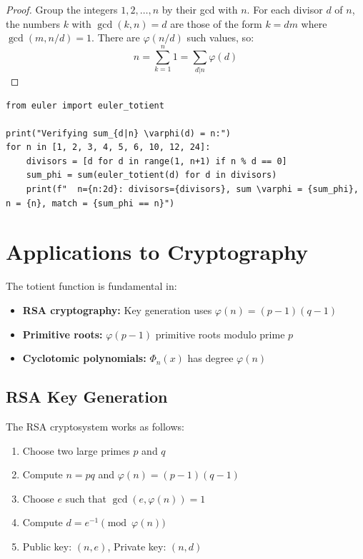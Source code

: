 \begin{proof}
Group the integers $1, 2, \ldots, n$ by their gcd with $n$. For each divisor $d$ of $n$,
the numbers $k$ with $\gcd(k,n) = d$ are those of the form $k = dm$ where $\gcd(m, n/d) = 1$.
There are $\varphi(n/d)$ such values, so:
\[
n = \sum_{k=1}^n 1 = \sum_{d|n} \varphi(d)
\]
\end{proof}

\begin{lstlisting}[caption={Sum of totients over divisors}, label=lst:totient_sum]
from euler import euler_totient

print("Verifying sum_{d|n} \varphi(d) = n:")
for n in [1, 2, 3, 4, 5, 6, 10, 12, 24]:
    divisors = [d for d in range(1, n+1) if n % d == 0]
    sum_phi = sum(euler_totient(d) for d in divisors)
    print(f"  n={n:2d}: divisors={divisors}, sum \varphi = {sum_phi}, n = {n}, match = {sum_phi == n}")
\end{lstlisting}

\section{Applications to Cryptography}

The totient function is fundamental in:
\begin{itemize}
    \item \textbf{RSA cryptography:} Key generation uses $\varphi(n) = (p-1)(q-1)$
    \item \textbf{Primitive roots:} $\varphi(p-1)$ primitive roots modulo prime $p$
    \item \textbf{Cyclotomic polynomials:} $\Phi_n(x)$ has degree $\varphi(n)$
\end{itemize}

\subsection{RSA Key Generation}

The RSA cryptosystem works as follows:

\begin{enumerate}
\item Choose two large primes $p$ and $q$
\item Compute $n = pq$ and $\varphi(n) = (p-1)(q-1)$
\item Choose $e$ such that $\gcd(e, \varphi(n)) = 1$
\item Compute $d = e^{-1} \pmod{\varphi(n)}$
\item Public key: $(n, e)$, Private key: $(n, d)$
\end{enumerate}

